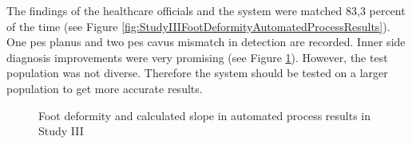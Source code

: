 The findings of the healthcare officials and the system were matched 83,3 percent of the time (see Figure \ref{fig:StudyIIIFootDeformityAutomatedProcessResults}). One pes planus and two pes cavus mismatch in detection are recorded. Inner side diagnosis improvements were very promising (see Figure \ref{fig:StudyIIISlopeResults}). However, the test population was not diverse. Therefore the system should be tested on a larger population to get more accurate results.
\linebreak

\begin{figure}[htbp]
\centering
{}
\caption{Foot deformity and calculated slope in automated process results in Study III}
\label{fig:StudyIIISlopeResults}
\end{figure} 

